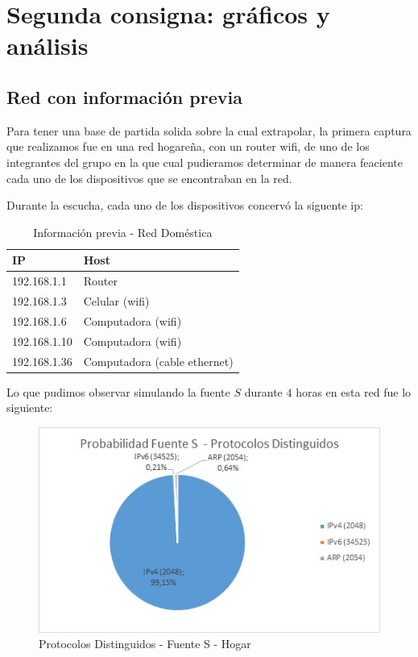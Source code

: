 \section{Segunda consigna: gráficos y análisis}

\subsection{Red con información previa}

Para tener una base de partida solida sobre la cual extrapolar, la primera captura que realizamos fue en una red hogareña, con un router wifi, de uno de los integrantes del grupo en la que cual pudieramos determinar de manera feaciente cada uno de los dispositivos que se encontraban en la red.

Durante la escucha, cada uno de los dispositivos concervó la siguente ip:\\
\begin{table}[htb]
\begin{center}
\begin{tabular}{|l|l|}
\hline
IP & Host \\
\hline \hline
192.168.1.1 & Router \\ \hline
192.168.1.3 & Celular (wifi) \\ \hline
192.168.1.6 & Computadora (wifi)  \\ \hline
192.168.1.10 & Computadora (wifi) \\ \hline
192.168.1.36 & Computadora (cable ethernet) \\ \hline
\end{tabular}
\caption{Información previa - Red Doméstica}
\label{tabla informacion}
\end{center}
\end{table}


Lo que pudimos observar simulando la fuente $S$ durante $4$ horas en esta red fue lo siguiente:\\
%

\begin{figure}[h!]
\centering
\includegraphics[scale=0.7]{./img/probaS_casa.jpg}
\caption{Protocolos Distinguidos - Fuente S - Hogar}
\end{figure}
\newpage

